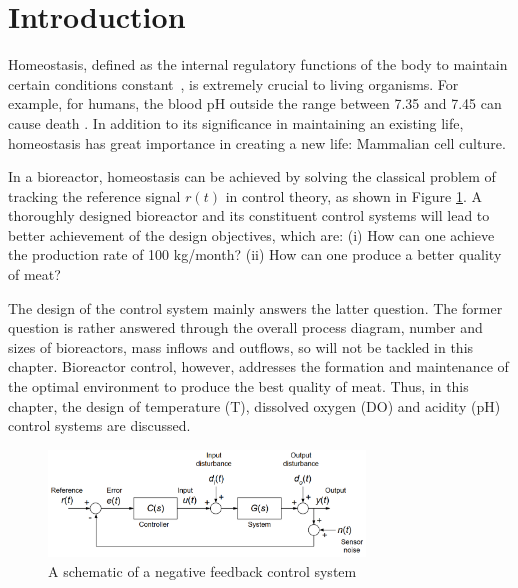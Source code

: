 \newpage
\section{Introduction}
\vspace{-3mm}



Homeostasis, defined as the internal regulatory functions of the body to maintain certain conditions constant~\citep{E-Guyton2006, E-Aging2022}, is extremely crucial to living organisms. For example, for humans, the blood pH outside the range between 7.35 and 7.45 can cause death \cite{E-Donaldson2013}. In addition to its significance in maintaining an existing life, homeostasis has great importance in creating a new life: Mammalian cell culture.

In a bioreactor, homeostasis can be achieved by solving the classical problem of tracking the reference signal $r(t)$ in control theory, as shown in Figure \ref{figure:E-1-1-control-system}. A thoroughly designed bioreactor and its constituent control systems will lead to better achievement of the design objectives, which are: (i) How can one achieve the production rate of 100 kg/month? (ii) How can one produce a better quality of meat?

The design of the control system mainly answers the latter question. The former question is rather answered through the overall process diagram, number and sizes of bioreactors, mass inflows and outflows, so will not be tackled in this chapter. Bioreactor control, however, addresses the formation and maintenance of the optimal environment to produce the best quality of meat. Thus, in this chapter, the design of temperature (T), dissolved oxygen (DO) and acidity (pH) control systems are discussed.

\begin{figure}[h]
    \centering
    \includegraphics[width=0.75\textwidth]{eunsoo/E-1-1-control-system.png}
    \hfill
    \caption{A schematic of a negative feedback control system \citet{E-Cannon2022}}
    \label{figure:E-1-1-control-system}
\end{figure}


